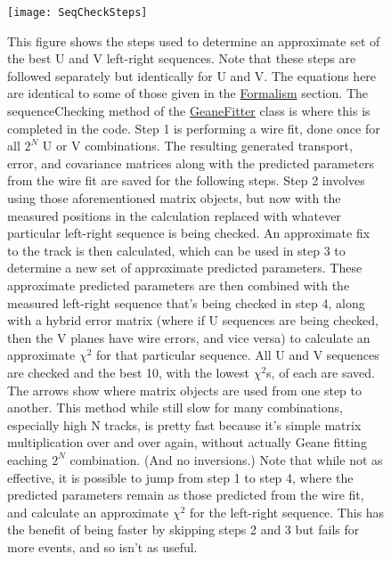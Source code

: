 			\begin{figure}[]
				\caption{This figure shows the steps used to determine an approximate set of the best U and V left-right sequences. Note that these steps are followed separately but identically for U and V. The equations here are identical to some of those given in the \hyperref[sec:Formalism]{Formalism} section. The sequenceChecking method of the \hyperref[sec:GeaneFitter]{GeaneFitter} class is where this is completed in the code. Step 1 is performing a wire fit, done once for all $2^{N}$ U or V combinations. The resulting generated transport, error, and covariance matrices along with the predicted parameters from the wire fit are saved for the following steps. Step 2 involves using those aforementioned matrix objects, but now with the measured positions in the calculation replaced with whatever particular left-right sequence is being checked. An approximate fix to the track is then calculated, which can be used in step 3 to determine a new set of approximate predicted parameters. These approximate predicted parameters are then combined with the measured left-right sequence that's being checked in step 4, along with a hybrid error matrix (where if U sequences are being checked, then the V planes have wire errors, and vice versa) to calculate an approximate $\chi^{2}$ for that particular sequence. All U and V sequences are checked and the best 10, with the lowest $\chi^{2}$s, of each are saved. The arrows show where matrix objects are used from one step to another. This method while still slow for many combinations, especially high N tracks, is pretty fast because it's simple matrix multiplication over and over again, without actually Geane fitting eaching $2^{N}$ combination. (And no inversions.) Note that while not as effective, it is possible to jump from step 1 to step 4, where the predicted parameters remain as those predicted from the wire fit, and calculate an approximate $\chi^{2}$ for the left-right sequence. This has the benefit of being faster by skipping steps 2 and 3 but fails for more events, and so isn't as useful.}
				\hspace{10 mm}
				\centering
				\texttt{[image: SeqCheckSteps]}
				\label{fig:SeqCheckSteps}
			\end{figure}

